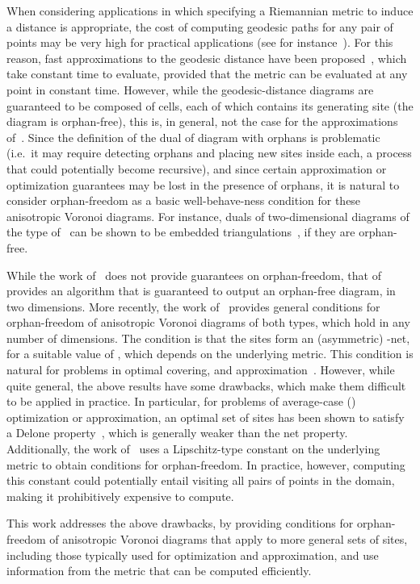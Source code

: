 \documentclass[11pt]{article}
\begin{document}
When considering applications in which specifying a Riemannian metric to induce a distance is appropriate, 
 the cost of computing geodesic paths for any pair of points may be very high for practical applications (see for instance~\cite{MMP}). 
 For this reason, fast approximations to the geodesic distance have been proposed~\cite{DW,LS}, which take constant time to evaluate, provided that the metric can be evaluated at any point in constant time. 
 However, while the geodesic-distance diagrams are guaranteed to be composed of cells, each of which contains its generating site (the diagram is orphan-free), 
 	this is, in general, not the case for the approximations of~\cite{DW,LS}. 
Since the definition of the dual of diagram with orphans is problematic (i.e.\ it may require detecting orphans and placing new sites inside each, a process that could potentially become  recursive), 
and since certain approximation or optimization guarantees may be lost in the presence of orphans, 
it is natural to consider orphan-freedom as a basic well-behave-ness condition for these anisotropic Voronoi diagrams. 
For instance, duals of two-dimensional diagrams of the type of~\cite{DW} can be shown to be embedded triangulations~\cite{adt}, if they are orphan-free. 

While the work of~\cite{DW} does not provide guarantees on orphan-freedom, that of~\cite{LS} provides an algorithm that is guaranteed to output an orphan-free diagram, in two dimensions. 
More recently, the work of~\cite{avd} provides general conditions for orphan-freedom of anisotropic Voronoi diagrams of both types, 
	which hold in any number of dimensions. The condition is that the sites form an (asymmetric) -net, for a suitable value of , which depends on the underlying metric. 
This condition is natural for problems in optimal covering, and  approximation~\cite{GruberMenets,enets}. 
However, while quite general, the above results have some drawbacks, which make them difficult to be applied in practice. In particular, for problems of average-case () optimization or approximation, an optimal set of sites has been shown to satisfy a Delone property~\cite{enets,OQ,GruberOQ}, which is generally weaker than the net property. 
Additionally, the work of~\cite{avd} uses a Lipschitz-type constant on the underlying metric to obtain conditions for orphan-freedom. 
In practice, however, computing this constant could potentially entail visiting all pairs of points in the domain, making it prohibitively expensive to compute. 

This work addresses the above drawbacks, by providing conditions for orphan-freedom of anisotropic Voronoi diagrams that apply to more general sets of sites, 
including those typically used for  optimization and approximation, 
and use information from the metric that can be computed efficiently. 
\end{document}
